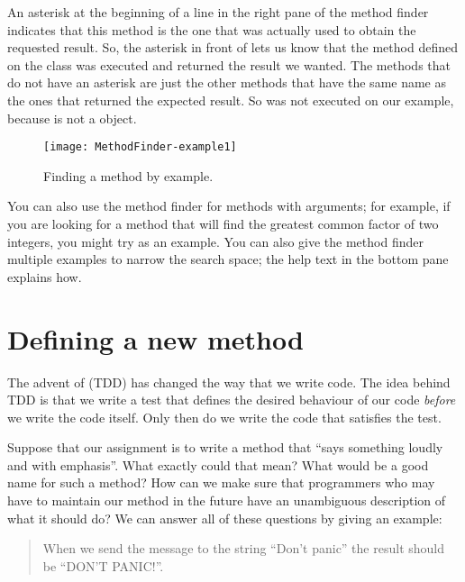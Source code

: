 \documentclass[a4paper,10pt,twoside]{book}
\begin{document}
An asterisk at the beginning of a line in the right pane of the method finder indicates that this method is the one that was actually used to obtain the requested result. 
So, the asterisk in front of  lets us know that the method  defined on the class  was executed and returned the result we wanted. The methods that do not have an asterisk are just the other methods that have the same name as the ones that returned the expected result. So  was not executed on our example, because  is not a  object.

\begin{figure}[hbt]
\centerline {\texttt{[image: MethodFinder-example1]}}
\caption{Finding a method by example.
}
\end{figure}

You can also use the method finder for methods with arguments; for example, if you are looking for a method that will find the greatest common factor of two integers, you might try  as an example.  You can also give the method finder multiple examples to narrow the search space; the help text in the bottom pane explains how.

\section{Defining a new method}

The advent of \cite{Beck03a} (TDD) has changed the way that we write code.  
The idea behind TDD is that we write a test that defines the desired behaviour of our code \emph{before} we write the code itself.
Only then do we write the code that satisfies the test.

Suppose that our assignment is to write a method that ``says something loudly and with emphasis''.  What exactly could that mean?  What would be a good name for such a method?  How can we make sure  that programmers who may have to maintain our method in the future have an unambiguous description of what it should do?   We can answer all of these questions by giving an example:

\begin{quote}
When we send the message  to the string ``Don't panic'' the result should be ``DON'T PANIC!''.
\end{quote}
\end{document}
